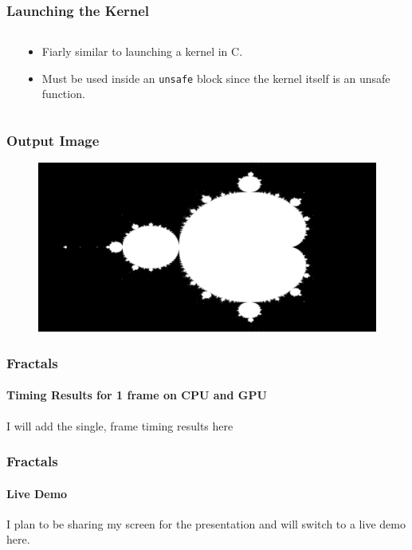 \documentclass[aspectratio=169]{beamer}
\begin{document}
\begin{frame}
	\frametitle{Launching the Kernel}
	\begin{columns}
		\begin{column}{0.55\textwidth}
			
		\end{column}
		\begin{column}{0.3\textwidth}
			\begin{itemize}
				\item Fiarly similar to launching a kernel in C.
				\item Must be used inside an \Verb|unsafe| block since the kernel itself is an unsafe function.
			\end{itemize}
		\end{column}
	\end{columns}
\end{frame}

\begin{frame}
	\frametitle{Output Image}
	\begin{figure}[H]
		\centering
		\includegraphics[width=\textwidth]{./figures/mandelbrot.png}
	\end{figure}
\end{frame}

\begin{frame}
	\frametitle{Fractals}
	\framesubtitle{Timing Results for 1 frame on CPU and GPU}

	I will add the single, frame timing results here
\end{frame}

\begin{frame}
	\frametitle{Fractals}
	\framesubtitle{Live Demo}

	I plan to be sharing my screen for the presentation and will switch to a live demo here.
\end{frame}
\end{document}
